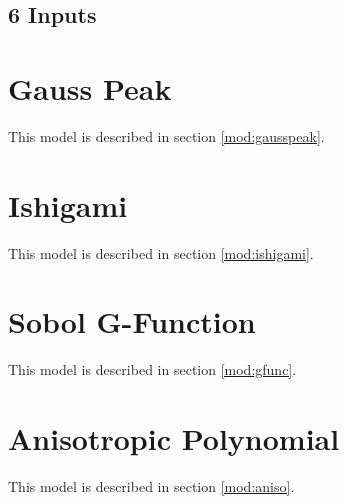 \subsection{6 Inputs}

\section{Gauss Peak}
This model is described in section \ref{mod:gausspeak}.


\section{Ishigami}
This model is described in section \ref{mod:ishigami}.

\section{Sobol G-Function}
This model is described in section \ref{mod:gfunc}.

\section{Anisotropic Polynomial}
This model is described in section \ref{mod:aniso}.
